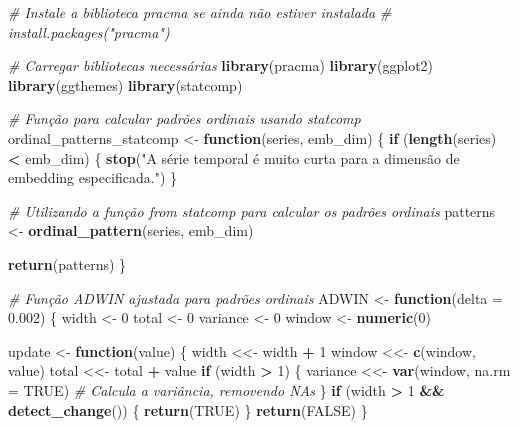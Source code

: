 \documentclass[
]{article}
\newenvironment{Shaded}{\begin{snugshade}}{\end{snugshade}}
\newcommand{\AttributeTok}[1]{\textcolor[rgb]{0.13,0.29,0.53}{#1}}
\newcommand{\CommentTok}[1]{\textcolor[rgb]{0.56,0.35,0.01}{\textit{#1}}}
\newcommand{\ConstantTok}[1]{\textcolor[rgb]{0.56,0.35,0.01}{#1}}
\newcommand{\ControlFlowTok}[1]{\textcolor[rgb]{0.13,0.29,0.53}{\textbf{#1}}}
\newcommand{\DecValTok}[1]{\textcolor[rgb]{0.00,0.00,0.81}{#1}}
\newcommand{\FloatTok}[1]{\textcolor[rgb]{0.00,0.00,0.81}{#1}}
\newcommand{\FunctionTok}[1]{\textcolor[rgb]{0.13,0.29,0.53}{\textbf{#1}}}
\newcommand{\NormalTok}[1]{#1}
\newcommand{\OtherTok}[1]{\textcolor[rgb]{0.56,0.35,0.01}{#1}}
\newcommand{\SpecialCharTok}[1]{\textcolor[rgb]{0.81,0.36,0.00}{\textbf{#1}}}
\newcommand{\StringTok}[1]{\textcolor[rgb]{0.31,0.60,0.02}{#1}}
\begin{document}
\begin{Shaded}
\begin{Highlighting}[]
\CommentTok{\# Instale a biblioteca \textquotesingle{}pracma\textquotesingle{} se ainda não estiver instalada}
\CommentTok{\# install.packages("pracma")}

\CommentTok{\# Carregar bibliotecas necessárias}
\FunctionTok{library}\NormalTok{(pracma)}
\FunctionTok{library}\NormalTok{(ggplot2)}
\FunctionTok{library}\NormalTok{(ggthemes)}
\FunctionTok{library}\NormalTok{(statcomp)}

\CommentTok{\# Função para calcular padrões ordinais usando statcomp}
\NormalTok{ordinal\_patterns\_statcomp }\OtherTok{\textless{}{-}} \ControlFlowTok{function}\NormalTok{(series, emb\_dim) \{}
  \ControlFlowTok{if}\NormalTok{ (}\FunctionTok{length}\NormalTok{(series) }\SpecialCharTok{\textless{}}\NormalTok{ emb\_dim) \{}
    \FunctionTok{stop}\NormalTok{(}\StringTok{"A série temporal é muito curta para a dimensão de embedding especificada."}\NormalTok{)}
\NormalTok{  \}}
  
  \CommentTok{\# Utilizando a função from \textasciigrave{}statcomp\textasciigrave{} para calcular os padrões ordinais}
\NormalTok{  patterns }\OtherTok{\textless{}{-}} \FunctionTok{ordinal\_pattern}\NormalTok{(series, emb\_dim)}
  
  \FunctionTok{return}\NormalTok{(patterns)}
\NormalTok{\}}

\CommentTok{\# Função ADWIN ajustada para padrões ordinais}
\NormalTok{ADWIN }\OtherTok{\textless{}{-}} \ControlFlowTok{function}\NormalTok{(}\AttributeTok{delta =} \FloatTok{0.002}\NormalTok{) \{}
\NormalTok{  width }\OtherTok{\textless{}{-}} \DecValTok{0}
\NormalTok{  total }\OtherTok{\textless{}{-}} \DecValTok{0}
\NormalTok{  variance }\OtherTok{\textless{}{-}} \DecValTok{0}
\NormalTok{  window }\OtherTok{\textless{}{-}} \FunctionTok{numeric}\NormalTok{(}\DecValTok{0}\NormalTok{)}
  
\NormalTok{  update }\OtherTok{\textless{}{-}} \ControlFlowTok{function}\NormalTok{(value) \{}
\NormalTok{    width }\OtherTok{\textless{}\textless{}{-}}\NormalTok{ width }\SpecialCharTok{+} \DecValTok{1}
\NormalTok{    window }\OtherTok{\textless{}\textless{}{-}} \FunctionTok{c}\NormalTok{(window, value)}
\NormalTok{    total }\OtherTok{\textless{}\textless{}{-}}\NormalTok{ total }\SpecialCharTok{+}\NormalTok{ value}
    \ControlFlowTok{if}\NormalTok{ (width }\SpecialCharTok{\textgreater{}} \DecValTok{1}\NormalTok{) \{}
\NormalTok{      variance }\OtherTok{\textless{}\textless{}{-}} \FunctionTok{var}\NormalTok{(window, }\AttributeTok{na.rm =} \ConstantTok{TRUE}\NormalTok{) }\CommentTok{\# Calcula a variância, removendo NAs}
\NormalTok{    \}}
    \ControlFlowTok{if}\NormalTok{ (width }\SpecialCharTok{\textgreater{}} \DecValTok{1} \SpecialCharTok{\&\&} \FunctionTok{detect\_change}\NormalTok{()) \{}
      \FunctionTok{return}\NormalTok{(}\ConstantTok{TRUE}\NormalTok{)}
\NormalTok{    \}}
    \FunctionTok{return}\NormalTok{(}\ConstantTok{FALSE}\NormalTok{)}
\NormalTok{  \}}
  

\end{Highlighting}
\end{Shaded}
\end{document}
